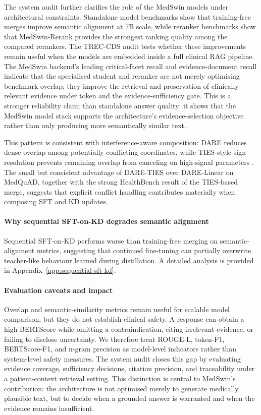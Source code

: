 \documentclass[conference]{IEEEtran}
\begin{document}
The system audit further clarifies the role of the MedSwin models under architectural constraints. Standalone model benchmarks show that training-free merges improve semantic alignment at 7B scale, while reranker benchmarks show that MedSwin-Rerank provides the strongest ranking quality among the compared rerankers. The TREC-CDS audit tests whether these improvements remain useful when the models are embedded inside a full clinical RAG pipeline. The MedSwin backend's leading critical-facet recall and evidence-document recall indicate that the specialised student and reranker are not merely optimising benchmark overlap; they improve the retrieval and preservation of clinically relevant evidence under token and the evidence-sufficiency gate. This is a stronger reliability claim than standalone answer quality: it shows that the MedSwin model stack supports the architecture's evidence-selection objective rather than only producing more semantically similar text.

This pattern is consistent with interference-aware composition: DARE reduces dense overlap among potentially conflicting coordinates, while TIES-style sign resolution prevents remaining overlap from canceling on high-signal parameters \cite{yu2023supermario,yadav2023ties}. The small but consistent advantage of DARE-TIES over DARE-Linear on MedQuAD, together with the strong HealthBench result of the TIES-based merge, suggests that explicit conflict handling contributes materially when composing SFT and KD updates.


\paragraph{Why sequential SFT-on-KD degrades semantic alignment}
Sequential SFT-on-KD performs worse than training-free merging on semantic-alignment metrics, suggesting that continued fine-tuning can partially overwrite teacher-like behaviour learned during distillation. A detailed analysis is provided in Appendix~\ref{app:sequential-sft-kd}.

\paragraph{Evaluation caveats and impact}
Overlap and semantic-similarity metrics remain useful for scalable model comparison, but they do not establish clinical safety. A response can obtain a high BERTScore while omitting a contraindication, citing irrelevant evidence, or failing to disclose uncertainty. We therefore treat ROUGE-L, token-F1, BERTScore-F1, and n-gram precision as model-level indicators rather than system-level safety measures. The system audit closes this gap by evaluating evidence coverage, sufficiency decisions, citation precision, and traceability under a patient-context retrieval setting. This distinction is central to MedSwin's contribution: the architecture is not optimised merely to generate medically plausible text, but to decide when a grounded answer is warranted and when the evidence remains insufficient.
\end{document}
